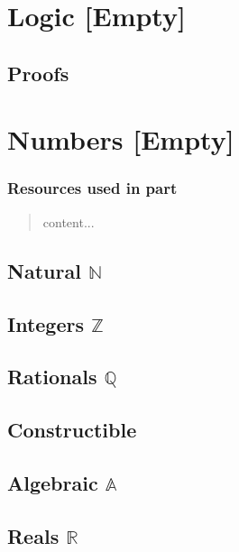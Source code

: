 \documentclass[12pt, english]{book}
\newenvironment{partintro}
{\vspace*{\fill}
	\section*{\centering Resources used in part \thepart}
	\begin{quotation}}
	{\end{quotation}\vspace*{\fill}\newpage}
\begin{document}
	
	\section*{}
	\tableofcontents
	
	\mainmatter
	\part{Logic [Empty]} \label{Logic Part}
	
	\chapter{Proofs}
	
	
	\part{Numbers [Empty]} \label{Numbers Part}
	\begin{partintro}
		content...
	\end{partintro}
	
	\chapter{Natural \(\mathbb{N} \)} \label{Natural Chapter - Numbers}
	
	\chapter{Integers \(\mathbb{Z} \)} \label{Integers Chapter - Numbers}
	
	\chapter{Rationals \(\mathbb{Q} \)} \label{Rationals Chapter - Numebers}
	
	\chapter{Constructible} \label{Constructible Chapter - Numbers}
	
	\chapter{Algebraic \(\mathbb{A} \)} \label{Algebraic Chapter - Numbers}
	
	\chapter{Reals \(\mathbb{R} \)} \label{Reals Chapter - Numbers}
	
\end{document}
